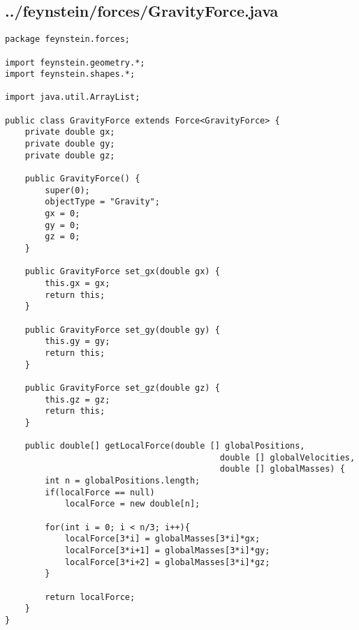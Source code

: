 \subsection*{../feynstein/forces/GravityForce.java}
\begin{lstlisting}
package feynstein.forces;

import feynstein.geometry.*;
import feynstein.shapes.*;

import java.util.ArrayList;

public class GravityForce extends Force<GravityForce> {
	private double gx;
	private double gy;
	private double gz;

    public GravityForce() {
		super(0);
		objectType = "Gravity";
		gx = 0;
		gy = 0;
		gz = 0;
    }
 
    public GravityForce set_gx(double gx) {
		this.gx = gx;
		return this;
    }
	
	public GravityForce set_gy(double gy) {
		this.gy = gy;
		return this;
    }
	
	public GravityForce set_gz(double gz) {
		this.gz = gz;
		return this;
    }

	public double[] getLocalForce(double [] globalPositions,
										   double [] globalVelocities,
										   double [] globalMasses) {
		int n = globalPositions.length;
		if(localForce == null)
			localForce = new double[n];
		
		for(int i = 0; i < n/3; i++){
			localForce[3*i] = globalMasses[3*i]*gx;
			localForce[3*i+1] = globalMasses[3*i]*gy;
			localForce[3*i+2] = globalMasses[3*i]*gz;
		}
		
		return localForce;
	}
}
\end{lstlisting}

